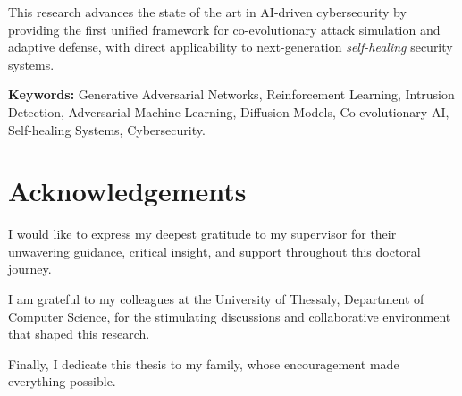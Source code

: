 This research advances the state of the art in AI-driven cybersecurity by
providing the first unified framework for co-evolutionary attack simulation and
adaptive defense, with direct applicability to next-generation
\emph{self-healing} security systems.

\vspace{1em}
\noindent\textbf{Keywords:} Generative Adversarial Networks, Reinforcement Learning,
Intrusion Detection, Adversarial Machine Learning, Diffusion Models,
Co-evolutionary AI, Self-healing Systems, Cybersecurity.

\clearpage

\chapter*{Acknowledgements}

I would like to express my deepest gratitude to my supervisor
for their unwavering guidance, critical insight,
and support throughout this doctoral journey.

I am grateful to my colleagues at the University of Thessaly,
Department of Computer Science, for the stimulating
discussions and collaborative environment that shaped this research.

Finally, I dedicate this thesis to my family, whose encouragement made
everything possible.

\clearpage
